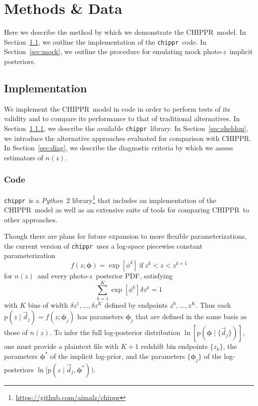 \documentclass[iop]{emulateapj}
\newcommand{\Sect}[1]{Section~\ref{#1}}
\newcommand{\project}[1]{\textsc{#1}}
\newcommand{\Chippr}{\project{CHIPPR}}%
\newcommand{\repo}[1]{\texttt{#1}}
\newcommand{\chippr}{\repo{chippr}}
\newcommand{\python}{\textit{Python}}%
\newcommand{\data}{\ensuremath{\vec{d}}}%
\newcommand{\pr}[1]{\ensuremath{\mathrm{p}(#1)}}%
\newcommand{\gvn}{\mid}%
\newcommand{\pz}{photo-$z$}
\newcommand{\pzpdf}{\pz\ posterior PDF}%
\newcommand{\pzip}{\pz\ implicit posterior}
\newcommand{\nz}{$n(z)$}
\newcommand{\bvec}[1]{\ensuremath{\boldsymbol{#1}}}%
\newcommand{\ndphi}{\bvec{\phi}}
\begin{document}
\section{Methods \& Data}
\label{sec:application}

Here we describe the method by which we demonstrate the \Chippr\ model.
In \Sect{sec:exp}, we outline the implementation of the \chippr\ code.
In \Sect{sec:mock}, we outline the procedure for emulating mock \pzip s.

\subsection{Implementation}
\label{sec:exp}

We implement the \Chippr\ model in code in order to perform tests of its validity and to compare its performance to that of traditional alternatives.
In \Sect{sec:mcmc}, we describe the  available \chippr\ library.
In \Sect{sec:sheldon}, we introduce the alternative approaches evaluated for comparison with \Chippr.
In \Sect{sec:diag}, we describe the diagnostic criteria by which we assess estimators of \nz.

\subsubsection{Code}
\label{sec:mcmc}

\chippr\ is a \python\ 2 library\footnote{\url{https://github.com/aimalz/chippr}} that includes an implementation of the \Chippr\ model as well as an extensive suite of tools for comparing \Chippr\ to other approaches.

Though there are plans for future expansion to more flexible parameterizations, the current version of \chippr\ uses a log-space piecewise constant parameterization
\begin{equation}
\label{eqn:logstepfunc}
f(z; \ndphi) = \exp[\phi^{k}]\ \mathrm{if}\ z^{k} < z < z^{k+1}
\end{equation}
for \nz\ and every \pzpdf, satisfying
\begin{equation}
\label{eqn:logstepfuncnorm}
\sum_{k=1}^{K} \exp[\phi^{k}] \delta z^{k} = 1
\end{equation}
with $K$ bins of width $\delta z^{1}, \dots, \delta z^{K}$ defined by endpoints $z^{0}, \dots, z^{K}$.
Thus each $\pr{z \gvn \data_{j}} = f(z; \ndphi_{j})$ has parameters $\ndphi_{j}$ that are defined in the same basis as those of \nz.
To infer the full log-posterior distribution $\ln[\pr{\ndphi \gvn \{\data_{j}\}}]$, one must provide a plaintext file with $K+1$ redshift bin endpoints $\{z_{k}\}$, the parameters $\ndphi^{*}$ of the implicit log-prior, and the parameters $\{\ndphi_{j}\}$ of the log-posteriors $\ln[\pr{z \gvn \data_{j}, \ndphi^{*})}$.
\end{document}
